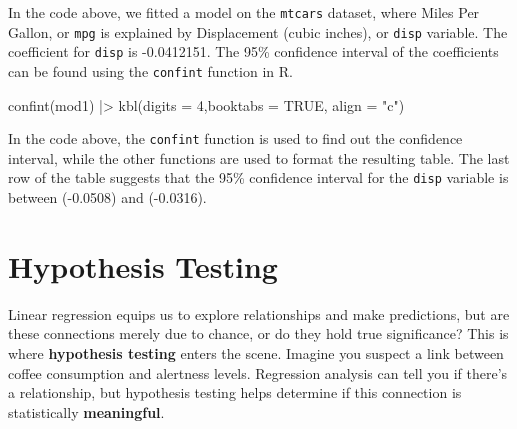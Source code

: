 \documentclass[
  letterpaper,
  paper =a4,
  twoside,
  openright,
  headsepline,
  footsepline,
  listof = totocnumbered,
  chapterprefix = true,
  firstiscover,
  parskip = full*]{scrbook}
\newenvironment{Shaded}{\begin{snugshade}}{\end{snugshade}}
\newcommand{\AttributeTok}[1]{\textcolor[rgb]{0.40,0.45,0.13}{#1}}
\newcommand{\ConstantTok}[1]{\textcolor[rgb]{0.56,0.35,0.01}{#1}}
\newcommand{\DecValTok}[1]{\textcolor[rgb]{0.68,0.00,0.00}{#1}}
\newcommand{\FunctionTok}[1]{\textcolor[rgb]{0.28,0.35,0.67}{#1}}
\newcommand{\NormalTok}[1]{\textcolor[rgb]{0.00,0.23,0.31}{#1}}
\newcommand{\SpecialCharTok}[1]{\textcolor[rgb]{0.37,0.37,0.37}{#1}}
\newcommand{\StringTok}[1]{\textcolor[rgb]{0.13,0.47,0.30}{#1}}
\begin{document}
In the code above, we fitted a model on the \texttt{mtcars} dataset,
where Miles Per Gallon, or \texttt{mpg} is explained by Displacement
(cubic inches), or \texttt{disp} variable. The \beta coefficient for
\texttt{disp} is -0.0412151. The 95\% confidence interval of the
coefficients can be found using the \texttt{confint} function in R.

\begin{Shaded}
\begin{Highlighting}[]
\FunctionTok{confint}\NormalTok{(mod1) }\SpecialCharTok{|\textgreater{}} \FunctionTok{kbl}\NormalTok{(}\AttributeTok{digits =} \DecValTok{4}\NormalTok{,}\AttributeTok{booktabs =} \ConstantTok{TRUE}\NormalTok{, }\AttributeTok{align =} \StringTok{"c"}\NormalTok{)}
\end{Highlighting}
\end{Shaded}

\begin{table}

\caption{\label{tbl-confint}Confidence Interval of Model Coefficients}


\end{table}%

In the code above, the \texttt{confint} function is used to find out the
confidence interval, while the other functions are used to format the
resulting table. The last row of the table suggests that the 95\%
confidence interval for the \texttt{disp} variable is between (-0.0508)
and (-0.0316).

\section{Hypothesis Testing}\label{hypothesis-testing}

Linear regression equips us to explore relationships and make
predictions, but are these connections merely due to chance, or do they
hold true significance? This is where \textbf{hypothesis testing} enters
the scene. Imagine you suspect a link between coffee consumption and
alertness levels. Regression analysis can tell you if there's a
relationship, but hypothesis testing helps determine if this connection
is statistically \textbf{meaningful}.
\end{document}
